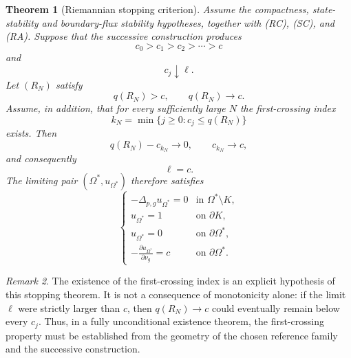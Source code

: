 \documentclass[11pt,a4paper]{article}
\newtheorem{theorem}{Theorem}[section]
\theoremstyle{definition}
\theoremstyle{remark}
\newtheorem{remark}[theorem]{Remark}
\begin{document}
\begin{theorem}[Riemannian stopping criterion]
\label{thm:riemannian-stopping}
Assume the compactness, state-stability and boundary-flux stability
hypotheses, together with (RC), (SC), and (RA). Suppose that the
successive construction produces
\[
c_0>c_1>c_2>\cdots>c
\]
and
\[
c_j\downarrow\ell.
\]
Let $(R_N)$ satisfy
\[
q(R_N)>c,
\qquad
q(R_N)\longrightarrow c.
\]
Assume, in addition, that for every sufficiently large $N$ the
first-crossing index
\[
k_N=\min\{j\geq0:c_j\leq q(R_N)\}
\]
exists. Then
\[
q(R_N)-c_{k_N}\longrightarrow0,
\qquad
c_{k_N}\longrightarrow c,
\]
and consequently
\[
\ell=c.
\]
The limiting pair $(\Omega^\ast,u_{\Omega^\ast})$ therefore satisfies
\[
\begin{cases}
-\Delta_{p,g}u_{\Omega^\ast}=0
&\text{in }\Omega^\ast\setminus K,\\
u_{\Omega^\ast}=1
&\text{on }\partial K,\\
u_{\Omega^\ast}=0
&\text{on }\partial\Omega^\ast,\\
-\displaystyle\frac{\partial u_{\Omega^\ast}}{\partial\nu_g}=c
&\text{on }\partial\Omega^\ast.
\end{cases}
\]
\end{theorem}

\begin{remark}
The existence of the first-crossing index is an explicit hypothesis of
this stopping theorem. It is not a consequence of monotonicity alone:
if the limit $\ell$ were strictly larger than $c$, then
$q(R_N)\to c$ could eventually remain below every $c_j$. Thus, in a
fully unconditional existence theorem, the first-crossing property
must be established from the geometry of the chosen reference family
and the successive construction.
\end{remark}
\end{document}
